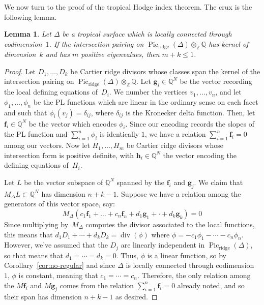 \documentclass[11pt]{amsart}
\newtheorem{lem}[thm]{Lemma}
\theoremstyle{definition}
\newcommand{\bff}{\mathbf f}
\newcommand{\Pic}{\operatorname{Pic}}
\newcommand{\QQ}{\mathbb Q}
\newcommand{\ridge}{\operatorname{ridge}}
\newcommand{\ZZ}{\mathbb Z}
\renewcommand{\div}{\operatorname{div}}
\begin{document}
We now turn to the proof of the tropical Hodge index theorem. The crux is the
following lemma.

\begin{lem}\label{lem:master}
Let $\Delta$ be a tropical surface which is locally connected through
codimension~$1$. If the intersection pairing on $\Pic_{\ridge}(\Delta)
\otimes_{\ZZ} \QQ$ has kernel of dimension~$k$ and has $m$ positive eigenvalues,
then $m + k \leq 1$.
\end{lem}

\begin{proof}
Let $D_1, \ldots, D_k$ be Cartier ridge divisors whose classes span the kernel
of the intersection pairing on $\Pic_{\ridge}(\Delta) \otimes_{\ZZ} \QQ$. Let
$\mathbf g_i \in \QQ^N$ be the vector recording the local defining equations
of~$D_i$. We
number the vertices $v_1, \ldots, v_n$, and let $\phi_1, \ldots, \phi_n$ be the
PL functions which are linear in the ordinary sense on each facet and such
that $\phi_{i}(v_j) = \delta_{ij}$, where $\delta_{ij}$ is the Kronecker delta
function. Then, let
$\bff_i \in \QQ^N$ be the vector which encodes $\phi_i$. Since our encoding
records the slopes of the PL function and $\sum_{i=1}^n \phi_i$ is identically
$1$, we have a relation $\sum_{i = 1}^n \bff_i
= 0$ among our vectors.
Now let $H_1, \ldots, H_m$ be Cartier ridge divisors whose intersection form is
positive definite, with $\mathbf h_i \in \QQ^N$ the vector encoding the defining
equations of~$H_i$.

Let $L$ be the vector subspace of $\QQ^N$ spanned by the $\bff_i$ and $\mathbf
g_j$. We claim that $M_\Delta L \subset \QQ^N$ has dimension $n + k - 1$.
Suppose we have a relation among the generators of this vector space, say:
\begin{equation*} M_\Delta (c_1 \bff_1 + \ldots + c_n \bff_n + d_1 \mathbf g_1 +
\cdot + d_k \mathbf g_k) = 0 \end{equation*} Since multiplying by~$M_\Delta$
computes the divisor associated to the local functions, this means that $d_1 D_1
+ \cdots + d_k D_k = \div(\phi)$ where $\phi = -c_1 \phi_1 - \cdots - c_n
\phi_n$. However, we've assumed that the $D_j$ are linearly independent in
$\Pic_{\ridge}(\Delta)$, so that means that $d_1 = \cdots = d_k = 0$. Thus,
$\phi$ is a linear function, so
by Corollary~\ref{cor:no-regular} and 
since $\Delta$ is locally connected through codimension~$1$,
$\phi$ is constant, meaning that $c_1 = \cdots = c_n$.
Therefore, the only relation among the $M \bff_i$ and $M \mathbf g_j$ comes from
the relation $\sum_{i=1}^n \bff_i = 0$ already noted, and so their span has
dimension $n + k - 1$ as desired.


\end{proof}
\end{document}
